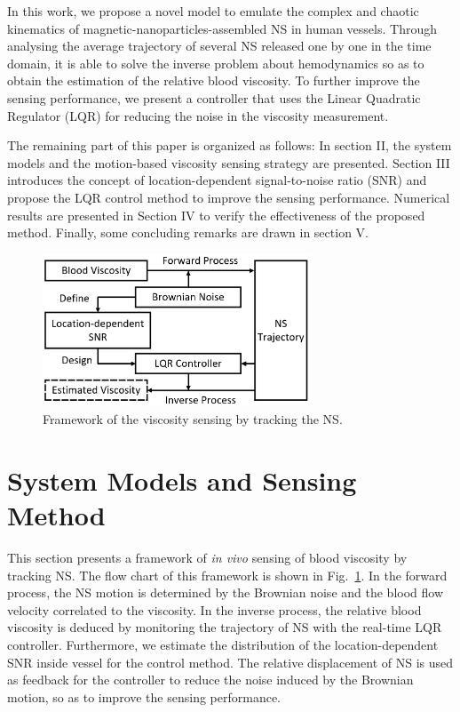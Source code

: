 \documentclass[conference]{IEEEtran}
\begin{document}
In this work, we propose a  novel model to emulate the complex and chaotic kinematics of magnetic-nanoparticles-assembled NS in human vessels. Through analysing the average trajectory of several NS released one by one in the time domain, it is able to solve the inverse problem about hemodynamics so as to obtain the estimation of the relative blood viscosity. To further improve the sensing performance, we present a controller that uses the Linear Quadratic Regulator (LQR) for reducing the noise in the viscosity measurement.

The remaining part of this paper is organized as follows: 
In section II, the system models and the motion-based viscosity sensing strategy are presented. Section III introduces the concept of location-dependent signal-to-noise ratio (SNR) and propose the LQR control method to improve the sensing performance. Numerical results are presented in Section IV to verify the effectiveness of the proposed method. Finally, some concluding remarks are drawn in section V.


\begin{figure}
\centering
\includegraphics[width=8cm]{fig1.png}
\caption{Framework of the viscosity sensing by tracking the NS.}
\label{fig1}
\end{figure}

\section{System Models and Sensing Method}




This section presents a framework of  \emph{in vivo} sensing of blood viscosity by tracking NS. The flow chart of this framework is shown in Fig.~\ref{fig1}. In the forward process, the NS motion is determined by the Brownian noise and the blood flow velocity correlated to the viscosity. In the inverse process, the relative blood viscosity is deduced by monitoring the trajectory of NS with the real-time LQR controller. Furthermore, we estimate the distribution of the location-dependent SNR inside vessel for the control method. The relative displacement of NS is used as feedback for the controller to reduce the noise induced by the Brownian motion, so as to improve the sensing performance.
\end{document}
